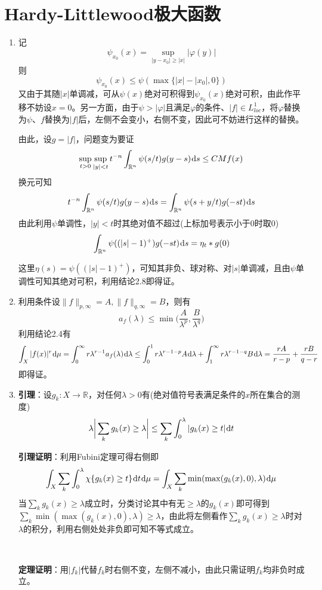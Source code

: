 \documentclass[a4paper,UTF8,fontset=windows]{ctexart}
\newcommand*{\dr}{\hspace{0.07em}\mathrm{d}}
\begin{document}
\section{Hardy-Littlewood极大函数}
\begin{enumerate}
    \item 记
    $$\psi_{x_0}(x)=\sup_{|y-x_0|\ge|x|}|\varphi(y)|$$
    则
    $$\psi_{x_0}(x)\le\psi(\max\{|x|-|x_0|,0\})$$
    又由于其随$|x|$单调减，可从$\psi(x)$绝对可积得到$\psi_{x_0}(x)$绝对可积，由此作平移不妨设$x=0$。另一方面，由于$\psi>|\varphi|$且满足$\varphi$的条件、$|f|\in L^1_{loc}$，将$\varphi$替换为$\psi$、$f$替换为$|f|$后，左侧不会变小，右侧不变，因此可不妨进行这样的替换。
    
    由此，设$g=|f|$，问题变为要证
    $$\sup_{t>0}\sup_{|y|<t}t^{-n}\int_{\mathbb{R}^n}\psi(s/t)g(y-s)\dr s\le CMf(x)$$
    换元可知
    $$t^{-n}\int_{\mathbb{R}^n}\psi(s/t)g(y-s)\dr s=\int_{\mathbb{R}^n}\psi(s+y/t)g(-st)\dr s$$
    由此利用$\psi$单调性，$|y|<t$时其绝对值不超过(上标加号表示小于0时取0)
    $$\int_{\mathbb{R}^n}\psi((|s|-1)^+)g(-st)\dr s=\eta_t*g(0)$$
    
    这里$\eta(s)=\psi((|s|-1)^+)$，可知其非负、球对称、对$|s|$单调减，且由$\psi$单调性可知其绝对可积，利用结论2.8即得证。

    \item 利用条件设$\|f\|_{p,\infty}=A,\|f\|_{q,\infty}=B$，则有
    $$a_f(\lambda)\le\min\bigg(\frac{A}{\lambda^p},\frac{B}{\lambda^q}\bigg)$$
    利用结论2.4有
    $$\int_X|f(x)|^r\dr\mu=\int_0^\infty r\lambda^{r-1}a_f(\lambda)\dr\lambda\le\int_0^1 r\lambda^{r-1-p}A\dr\lambda+\int_1^\infty r\lambda^{r-1-q}B\dr\lambda=\frac{rA}{r-p}+\frac{rB}{q-r}$$
    即得证。

    \item 
    \textbf{引理}：设$g_k:X\to\mathbb{R}$，对任何$\lambda>0$有(绝对值符号表满足条件的$x$所在集合的测度)
    $$\lambda\bigg|\sum_kg_k(x)\ge\lambda\bigg|\le\sum_k\int_0^\lambda|g_k(x)\ge t|\dr t$$

    \textbf{引理证明}：利用Fubini定理可得右侧即
    $$\int_X\sum_k\int_0^\lambda\chi\{g_k(x)\ge t\}\dr t\dr\mu=\int_X\sum_k\min(\max(g_k(x),0),\lambda)\dr\mu$$
    当$\sum_kg_k(x)\ge\lambda$成立时，分类讨论其中有无$\ge\lambda$的$g_k(x)$即可得到$\sum_k\min(\max(g_k(x),0),\lambda)\ge\lambda$，由此将左侧看作$\sum_kg_k(x)\ge\lambda$时对$\lambda$的积分，利用右侧处处非负即可知不等式成立。

    \

    \textbf{定理证明}：用$|f_k|$代替$f_k$时右侧不变，左侧不减小，由此只需证明$f_k$均非负时成立。
    

\end{enumerate}
\end{document}
